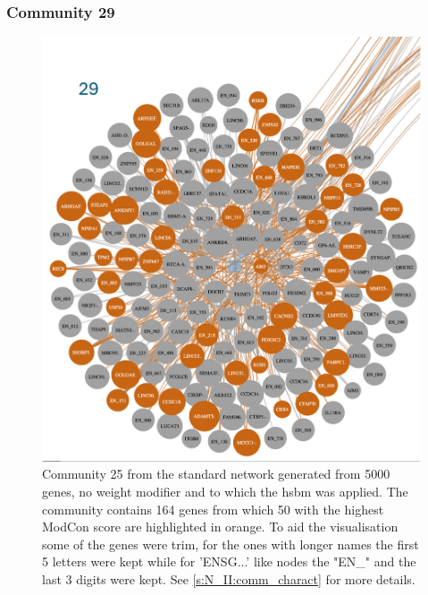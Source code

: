 \subsubsection{Community 29}

\begin{figure}[H]    
    \centering
    \includegraphics[width=1.0\textwidth,height=1.0\textheight,keepaspectratio]{Sections/Network_II/resources/non_tum/29_com.png}
    \caption{Community 25 from the standard network generated from 5000 genes, no weight modifier and to which the \acrshort{hsbm} was applied. The community contains 164 genes from which 50 with the highest ModCon score are highlighted in orange. To aid the visualisation some of the genes were trim, for the ones with longer names the first 5 letters were kept while for 'ENSG...' like nodes the "EN\_" and the last 3 digits were kept.  See \cref{s:N_II:comm_charact} for more details. }
    \label{fig:ap:com_29}
\end{figure}
